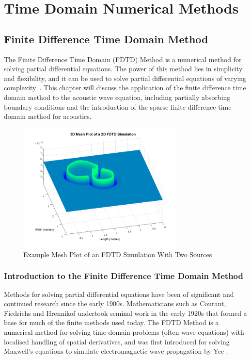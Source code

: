 %
%
%
\chapter{Time Domain Numerical Methods}
\section{Finite Difference Time Domain Method}
The Finite Difference Time Domain (FDTD) Method is a numerical method for solving partial differential equations. The power of this method lies in simplicity and flexibility, and it can be used to solve partial differential equations of varying complexity~\cite{Schneider2015}. This chapter will discuss the application of the finite difference time domain method to the acoustic wave equation, including partially absorbing boundary conditions and the introduction of the sparse finite difference time domain method for acoustics.

\begin{figure}[H]
\centering
  \includegraphics[width=0.75\textwidth]{./graphics/FDTDexample.png}
  \caption{Example Mesh Plot of an FDTD Simulation With Two Sources}
\end{figure}

\subsection{Introduction to the Finite Difference Time Domain Method}
Methods for solving partial differential equations have been of significant and continued research since the early 1900s. Mathematicians such as Courant, Fiedrichs and Hrennikof undertook seminal work in the early 1920s that formed a base for much of the finite methods used today. The FDTD Method is a numerical method for solving time domain problems (often wave equations) with localised handling of spatial derivatives, and was first introduced for solving Maxwell's equations to simulate electromagnetic wave propagation by Yee \cite{Yee1966}.\\

